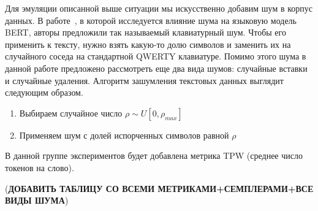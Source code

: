\documentclass{spbau-diploma}
\begin{document}
Для эмуляции описанной выше ситуации мы искусственно добавим шум в корпус данных. В работе~\cite{srivastava2020noisy}, в которой исследуется влияние шума на языковую модель BERT, авторы предложили так называемый клавиатурный шум. Чтобы его применить к тексту, нужно взять какую-то долю символов и заменить их на случайного соседа на стандартной QWERTY клавиатуре. Помимо этого шума в данной работе предложено рассмотреть еще два вида шумов: случайные вставки и случайные удаления. Алгоритм зашумления текстовых данных выглядит следующим образом.

\begin{enumerate}
	\item Выбираем случайное число $\rho \sim U[0, \rho_{max}]$
	\item Применяем шум с долей испорченных символов равной $\rho$
\end{enumerate}

В данной группе экспериментов будет добавлена метрика TPW (среднее число токенов на слово).

({\bf ДОБАВИТЬ ТАБЛИЦУ СО ВСЕМИ МЕТРИКАМИ+СЕМПЛЕРАМИ+ВСЕ ВИДЫ ШУМА})
\end{document}
